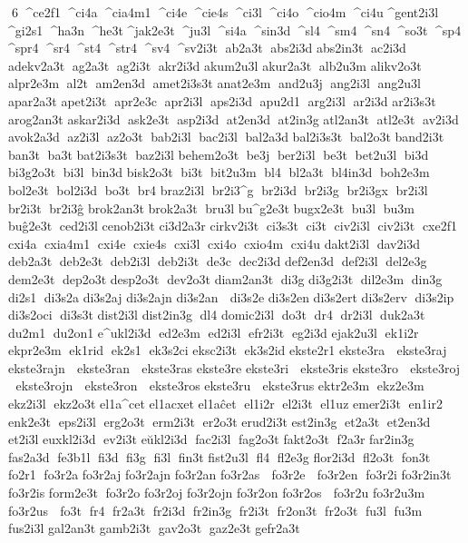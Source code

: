 6  ^ce2f1  ^ci4a  ^cia4m1  ^ci4e  ^cie4s  ^ci3l  ^ci4o  ^cio4m  ^ci4u 
 ^gent2i3l  ^gi2s1  ^ha3n  ^he3t 	 ^jak2e3t  ^ju3l  ^si4a  ^sin3d  ^sl4  ^sm4  ^sn4  ^so3t  ^sp4  ^spr4  ^sr4  ^st4  ^str4  ^sv4  ^sv2i3t  ab2a3t  abs2i3d 	 abs2in3t  ac2i3d 
 adekv2a3t  ag2a3t  ag2i3t  akr2i3d 	 akum2u3l 	 akur2a3t  alb2u3m 
 alikv2o3t 	 alpr2e3m  al2t  am2en3d  amet2i3s3t 	 anat2e3m  and2u3j  ang2i3l  ang2u3l 	 apar2a3t 	 apet2i3t  apr2e3c  apr2i3l  aps2i3d  apu2d1  arg2i3l  ar2i3d 	 ar2i3s3t 
 arog2an3t 
 askar2i3d  ask2e3t  asp2i3d  at2en3d  at2in3g 	 atl2an3t  atl2e3t  av2i3d 	 avok2a3d  az2i3l  az2o3t  bab2i3l  bac2i3l  bal2a3d 
 bal2i3s3t  bal2o3t 	 band2i3t  ban3t  ba3t 
 bat2i3s3t  baz2i3l 
 behem2o3t  be3j  ber2i3l  be3t  bet2u3l  bi3d 	 bi3g2o3t  bi3l  bin3d 	 bisk2o3t  bi3t  bit2u3m  bl4  bl2a3t  bl4in3d  boh2e3m  bol2e3t  bol2i3d  bo3t  br4 	 braz2i3l  br2i3^g  br2i3d  br2i3g  br2i3gx  br2i3l  br2i3t  br2i3ĝ 
 brok2an3t 	 brok2a3t  bru3l 	 bu^g2e3t 	 bugx2e3t  bu3l  bu3m 	 buĝ2e3t  ced2i3l 
 cenob2i3t 	 ci3d2a3r 
 cirkv2i3t  ci3s3t  ci3t  civ2i3l  civ2i3t  cxe2f1  cxi4a  cxia4m1  cxi4e  cxie4s  cxi3l  cxi4o  cxio4m  cxi4u 	 dakt2i3l  dav2i3d  deb2a3t  deb2e3t  deb2i3l  deb2i3t  de3c  dec2i3d 	 def2en3d  def2i3l  del2e3g  dem2e3t  dep2o3t 	 desp2o3t  dev2o3t 
 diam2an3t  di3g 	 di3g2i3t  dil2e3m  din3g  di2s1  di3s2a  	 di3s2aj  
 di3s2ajn  	 di3s2an   di3s2e  	 di3s2en  	 di3s2ert 	 di3s2erv  di3s2ip 	 di3s2oci  di3s3t 	 dist2i3l 
 dist2in3g  dl4 
 domic2i3l  do3t  dr4  dr2i3l  duk2a3t  du2m1  du2on1 
 e^ukl2i3d  ed2e3m  ed2i3l  efr2i3t  eg2i3d 	 ejak2u3l  ek1i2r 	 ekpr2e3m  ek1rid  ek2s1  ek3s2ci 	 eksc2i3t  ek3s2id 	 ekste2r1 
 ekste3ra   ekste3raj   ekste3rajn   ekste3ran   ekste3ras  
 ekste3re  
 ekste3ri   ekste3ris  
 ekste3ro   ekste3roj   ekste3rojn   ekste3ron   ekste3ros  
 ekste3ru   ekste3rus  	 ektr2e3m  ekz2e3m  ekz2i3l  ekz2o3t 	 el1a^cet 	 el1acxet 	 el1aĉet  el1i2r  el2i3t  el1uz 	 emer2i3t  en1ir2  enk2e3t  eps2i3l  erg2o3t  erm2i3t  er2o3t 	 erud2i3t 	 est2in3g  et2a3t  et2en3d  et2i3l 
 euxkl2i3d  ev2i3t 
 eŭkl2i3d  fac2i3l  fag2o3t 	 fakt2o3t  f2a3r 	 far2in3g  fas2a3d  fe3b1l  fi3d  fi3g  fi3l  fin3t 	 fist2u3l  fl4  fl2e3g 	 flor2i3d  fl2o3t  fon3t  fo2r1  fo3r2a  	 fo3r2aj  
 fo3r2ajn  	 fo3r2an  	 fo3r2as   fo3r2e   fo3r2en  fo3r2i  
 fo3r2in3t 	 fo3r2is  	 form2e3t  fo3r2o  	 fo3r2oj  
 fo3r2ojn  	 fo3r2on  	 fo3r2os   fo3r2u  	 fo3r2u3m 	 fo3r2us   fo3t  fr4  fr2a3t  fr2i3d  fr2in3g  fr2i3t  fr2on3t  fr2o3t  fu3l  fu3m  fus2i3l 	 gal2an3t 	 gamb2i3t  gav2o3t  gaz2e3t 	 gefr2a3t 
